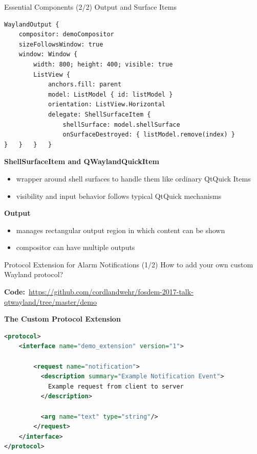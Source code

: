 \documentclass[ucs,9pt]{beamer}
\begin{document}
\begin{frame}[fragile]
    {Essential Components (2/2)}
    {Output and Surface Items}

    \vspace{-1em}
    \begin{lstlisting}
WaylandOutput {
    compositor: demoCompositor
    sizeFollowsWindow: true
    window: Window {
        width: 800; height: 400; visible: true
        ListView {
            anchors.fill: parent
            model: ListModel { id: listModel }
            orientation: ListView.Horizontal
            delegate: ShellSurfaceItem {
                shellSurface: model.shellSurface
                onSurfaceDestroyed: { listModel.remove(index) }
}   }   }   }
    \end{lstlisting}
    \vspace{-1em}

    \textbf{ShellSurfaceItem and QWaylandQuickItem}
    \begin{itemize}
        \item wrapper around shell surfaces to handle them like ordinary QtQuick Items
        \item visibility and input behavior follows typical QtQuick mechanisms
    \end{itemize}
    \smallskip

    \textbf{Output}
    \begin{itemize}
        \item manages rectangular output region in which content can be shown
        \item compositor can have multiple outputs
    \end{itemize}
\end{frame}


\begin{frame}[fragile]
    {Protocol Extension for Alarm Notifications (1/2)}
    {How to add your own custom Wayland protocol?}

    \textbf{Code:}\ {\small \url{https://github.com/cordlandwehr/fosdem-2017-talk-qtwayland/tree/master/demo}}
    \bigskip

    \textbf{The Custom Protocol Extension}
\begin{lstlisting}[language=Xml]
<protocol>
    <interface name="demo_extension" version="1">

        <request name="notification">
          <description summary="Example Notification Event">
            Example request from client to server
          </description>

          <arg name="text" type="string"/>
        </request>
    </interface>
</protocol>
\end{lstlisting}
\end{frame}
\end{document}
